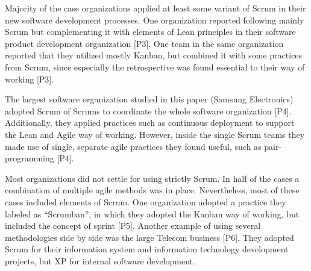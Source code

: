 Majority of the case organizations applied at least some variant of
Scrum in their new software development processes. One organization
reported following mainly Scrum but complementing it with elements of
Lean principles in their software product development organization [P3].
One team in the same organization reported that they utilized mostly
Kanban, but combined it with some practices from Scrum, since especially
the retrospective was found essential to their way of working [P3].

The largest software organization studied in this paper (Samsung
Electronics) adopted Scrum of Scrums to coordinate the whole software
organization [P4]. Additionally, they applied practices such as
continuous deployment to support the Lean and Agile way of working.
However, inside the single Scrum teams they made use of single, separate
agile practices they found useful, such as pair-programming [P4].

Most organizations did not settle for using strictly Scrum. In half
of the cases a combination of multiple agile methods was in place.
Nevertheless, most of these cases included elements of Scrum. One
organization adopted a practice they labeled as ``Scrumban'', in which
they adopted the Kanban way of working, but included the concept of
sprint [P5]. Another example of using several methodologies side by
side was the large Telecom business [P6]. They adopted Scrum for their
information system and information technology development projects, but
XP for internal software development.

\bigskip

\bigskip
